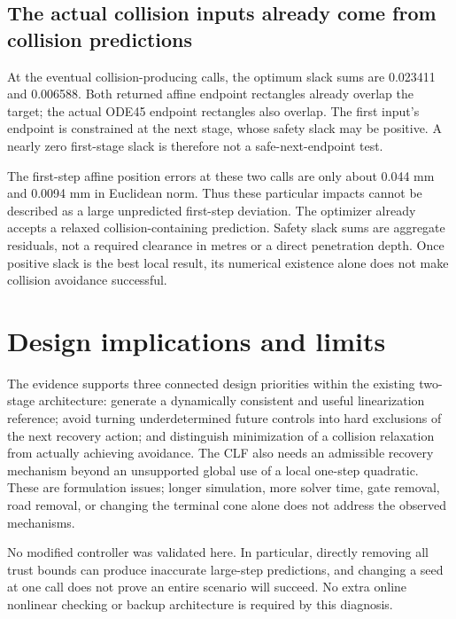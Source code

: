 \documentclass[11pt]{article}
\begin{document}
\subsection{The actual collision inputs already come from collision predictions}
At the eventual collision-producing calls, the optimum slack sums are
0.023411 and 0.006588. Both returned affine endpoint rectangles already
overlap the target; the actual ODE45 endpoint rectangles also overlap.
The first input's endpoint is constrained at the next stage, whose safety
slack may be positive. A nearly zero first-stage slack is therefore not a
safe-next-endpoint test.

The first-step affine position errors at these two calls are only about
0.044 mm and 0.0094 mm in Euclidean norm. Thus these particular impacts
cannot be described as a large unpredicted first-step deviation. The optimizer
already accepts a relaxed collision-containing prediction. Safety slack sums
are aggregate residuals, not a required clearance in metres or a direct
penetration depth. Once positive slack is the best local result, its numerical
existence alone does not make collision avoidance successful.

\section{Design implications and limits}
The evidence supports three connected design priorities within the existing
two-stage architecture: generate a dynamically consistent and useful
linearization reference; avoid turning underdetermined future controls into
hard exclusions of the next recovery action; and distinguish minimization of
a collision relaxation from actually achieving avoidance. The CLF also needs
an admissible recovery mechanism beyond an unsupported global use of a
local one-step quadratic. These are formulation issues; longer simulation,
more solver time, gate removal, road removal, or changing the terminal cone
alone does not address the observed mechanisms.

No modified controller was validated here. In particular, directly removing
all trust bounds can produce inaccurate large-step predictions, and changing
a seed at one call does not prove an entire scenario will succeed. No extra
online nonlinear checking or backup architecture is required by this diagnosis.
\end{document}
